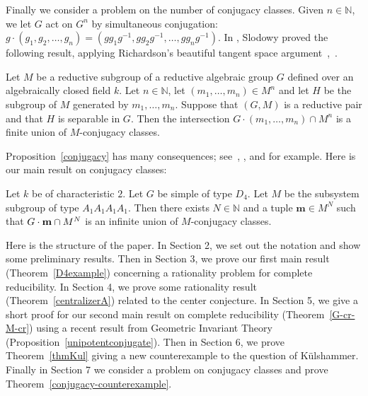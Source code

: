 Finally we consider a problem on the number of conjugacy classes. Given $n\in {\mathbb N}$, we let $G$ act on $G^n$ by simultaneous conjugation:
$
g\cdot(g_1, g_2, \ldots, g_n) = (g g_1 g^{-1}, g g_2 g^{-1}, \ldots, g g_n g^{-1}). 
$
In \cite{Slodowy-book}, Slodowy proved the following result, applying Richardson's beautiful tangent space argument~\cite[Sec.~3]{Richardson-Conjugacy-Ann},~\cite[Lem.~3.1]{Richardson-orbits-BullAustralian}. 
\begin{prop}\label{conjugacy}
Let $M$ be a reductive subgroup of a reductive algebraic group $G$ defined over an algebraically closed field $k$. Let $n\in {\mathbb N}$, let $(m_1, \ldots, m_n)\in M^n$ and let $H$ be the subgroup of $M$ generated by $m_1, \ldots, m_n$. Suppose that $(G, M)$ is a reductive pair and that $H$ is separable in $G$. Then the intersection $G\cdot (m_1, \ldots, m_n)\cap M^n$ is a finite union of $M$-conjugacy classes. 
\end{prop}

Proposition~\ref{conjugacy} has many consequences; see~\cite{Bate-geometric-Inventione}, \cite{Slodowy-book}, and \cite[Sec.~3]{Vinberg-invariants-JLT} for example. Here is our main result on conjugacy classes:

\begin{thm}\label{conjugacy-counterexample}
Let $k$ be of characteristic $2$. Let $G$ be simple of type $D_4$. Let $M$ be the subsystem subgroup of type $A_1 A_1 A_1 A_1$. Then there exists $N\in \mathbb{N}$ and a tuple $\mathbf{m}\in M^N$ such that $G\cdot \bold{m} \cap M^N$ is an infinite union of $M$-conjugacy classes. 
\end{thm} 

Here is the structure of the paper. In Section 2, we set out the notation and show some preliminary results. Then in Section 3, we prove our first main result (Theorem~\ref{D4example}) concerning a rationality problem for complete reducibility. In Section 4, we prove some rationality result (Theorem~\ref{centralizerA}) related to the center conjecture. In Section 5, we give a short proof for our second main result on complete reducibility (Theorem~\ref{G-cr-M-cr}) using a recent result from Geometric Invariant Theory (Proposition~\ref{unipotentconjugate}). Then in Section 6, we prove Theorem~\ref{thmKul} giving a new counterexample to the question of K\"ulshammer. Finally in Section 7 we consider a problem on conjugacy classes and prove Theorem~\ref{conjugacy-counterexample}.

